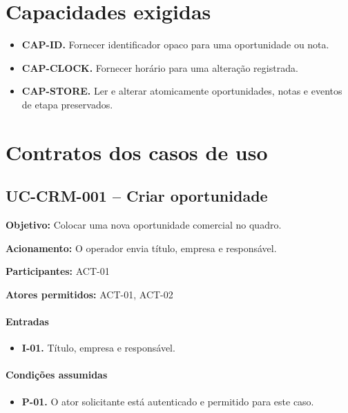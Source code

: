 \documentclass[10pt,a4paper]{article}
\begin{document}
\section{Capacidades exigidas}

\begin{itemize}

\item \textbf{CAP-ID.} Fornecer identificador opaco para uma oportunidade ou nota.

\item \textbf{CAP-CLOCK.} Fornecer horário para uma alteração registrada.

\item \textbf{CAP-STORE.} Ler e alterar atomicamente oportunidades, notas e eventos de etapa preservados.

\end{itemize}

\section{Contratos dos casos de uso}

\subsection{UC-CRM-001 -- Criar oportunidade}

\textbf{Objetivo:} Colocar uma nova oportunidade comercial no quadro.

\textbf{Acionamento:} O operador envia título, empresa e responsável.

\textbf{Participantes:} ACT-01

\textbf{Atores permitidos:} ACT-01, ACT-02

\paragraph{Entradas}

\begin{itemize}

\item \textbf{I-01.} Título, empresa e responsável.

\end{itemize}

\paragraph{Condições assumidas}

\begin{itemize}

\item \textbf{P-01.} O ator solicitante está autenticado e permitido para este caso.

\end{itemize}
\end{document}
